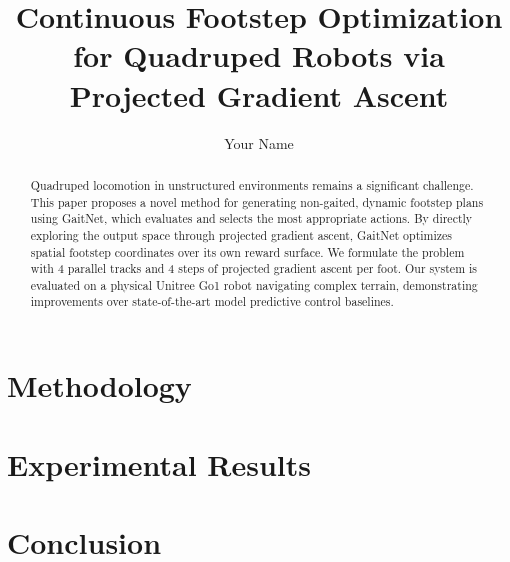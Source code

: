 \documentclass[10pt]{article}
\begin{document}
\title{Continuous Footstep Optimization for Quadruped Robots via Projected Gradient Ascent}
\author{Your Name}
\date{}
\maketitle

\begin{abstract}
Quadruped locomotion in unstructured environments remains a significant challenge. This paper proposes a novel method for generating non-gaited, dynamic footstep plans using GaitNet, which evaluates and selects the most appropriate actions. By directly exploring the output space through projected gradient ascent, GaitNet optimizes spatial footstep coordinates over its own reward surface. We formulate the problem with 4 parallel tracks and 4 steps of projected gradient ascent per foot. Our system is evaluated on a physical Unitree Go1 robot navigating complex terrain, demonstrating improvements over state-of-the-art model predictive control baselines.
\end{abstract}



\section{Methodology}
\label{sec:methodology}


\section{Experimental Results}
\label{sec:results}


\section{Conclusion}
\label{sec:conclusion}




\end{document}

